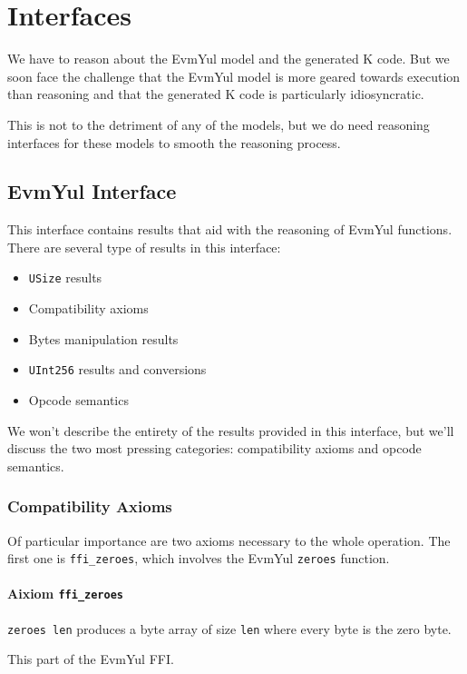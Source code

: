 \chapter{Interfaces}

We have to reason about the EvmYul model and the generated K code. But we soon
face the challenge that the EvmYul model is more geared towards execution than
reasoning and that the generated K code is particularly idiosyncratic.

This is not to the detriment of any of the models, but we do need reasoning
interfaces for these models to smooth the reasoning process.

\section{EvmYul Interface}

This interface contains results that aid with the reasoning of EvmYul functions.
There are several type of results in this interface:

\begin{itemize}
\item \texttt{USize} results
\item Compatibility axioms
\item Bytes manipulation results
\item \texttt{UInt256} results and conversions
\item Opcode semantics
\end{itemize}

We won't describe the entirety of the results provided in this interface, but
we'll discuss the two most pressing categories: compatibility axioms and opcode semantics.

\subsection{Compatibility Axioms}

Of particular importance are two axioms necessary to the whole operation. The
first one is \texttt{ffi_zeroes}, which involves the EvmYul \texttt{zeroes} function.

\subsubsection{\textbf{Aixiom \texttt{ffi_zeroes}}}

\begin{definition}[zeroes]\label{def:zeroes}
\texttt{zeroes len} produces a byte array of size \texttt{len} where every byte
is the zero byte.

This part of the EvmYul FFI.
\end{definition}

